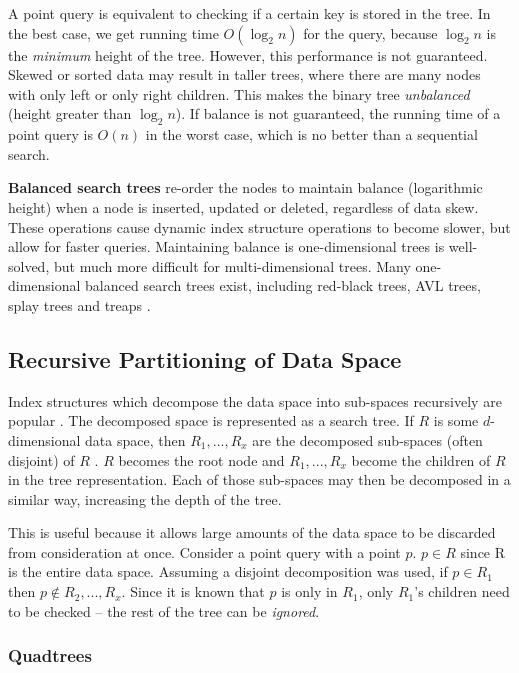 A point query is equivalent to checking if a certain key is stored in the tree. In the best case, we get running time $O(\log_2 n)$ for the query, because $\log_2 n$ is the \textit{minimum} height of the tree. However, this performance is not guaranteed. Skewed or sorted data may result in taller trees, where there are many nodes with only left or only right children. This makes the binary tree \textit{unbalanced} (height greater than $\log_2 n$). If balance is not guaranteed, the running time of a point query is $O(n)$ in the worst case, which is no better than a sequential search.

\textbf{Balanced search trees} re-order the nodes to maintain balance (logarithmic height) when a node is inserted, updated or deleted, regardless of data skew. These operations cause dynamic index structure operations to become slower, but allow for faster queries.  Maintaining balance is one-dimensional trees is well-solved, but much more difficult for multi-dimensional trees. Many one-dimensional balanced search trees exist, including red-black trees, AVL trees, splay trees and treaps \cite{introduction-to-algorithms}.

\subsection{Recursive Partitioning of Data Space}
\label{sec:recursive-partition-structures}

Index structures which decompose the data space into sub-spaces recursively are popular \cite{md-structures-samet}. The decomposed space is represented as a search tree. If $R$ is some $d$-dimensional data space, then $R_1,...,R_x$ are the decomposed sub-spaces (often disjoint) of $R$ . $R$ becomes the root node and $R_1,...,R_x$ become the children of $R$ in the tree representation. Each of those sub-spaces may then be decomposed in a similar way, increasing the depth of the tree.

This is useful because it allows large amounts of the data space to be discarded from consideration at once. Consider a point query with a point $p$. $p \in R$ since R is the entire data space. Assuming a disjoint decomposition was used, if $p \in R_1$ then $p \not\in R_2,...,R_x$. Since it is known that $p$ is only in $R_1$, only $R_1$'s children need to be checked -- the rest of the tree can be \textit{ignored}.

\subsubsection{Quadtrees}

